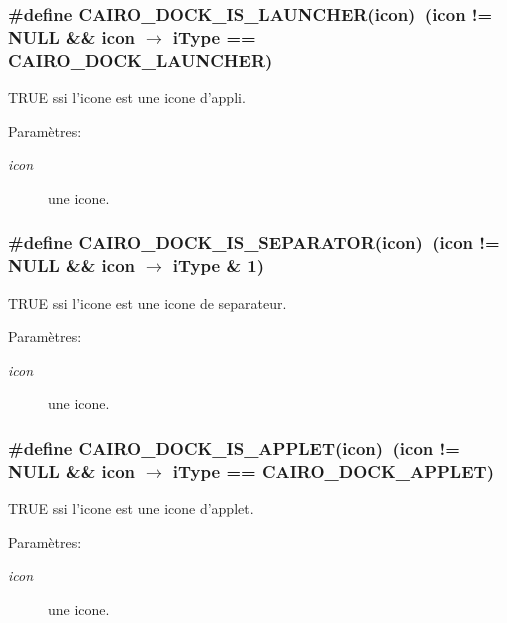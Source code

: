 \subsubsection{\setlength{\rightskip}{0pt plus 5cm}\#define CAIRO\_\-DOCK\_\-IS\_\-LAUNCHER(icon)~(icon != NULL \&\& icon $\rightarrow$ iType == CAIRO\_\-DOCK\_\-LAUNCHER)}\label{cairo-dock-icons_8h_168c94ad9d2454c1b5184144ce14619b}


TRUE ssi l'icone est une icone d'appli. \begin{Desc}
\item[Paramètres:]
\begin{description}
\item[{\em icon}]une icone. \end{description}
\end{Desc}
\subsubsection{\setlength{\rightskip}{0pt plus 5cm}\#define CAIRO\_\-DOCK\_\-IS\_\-SEPARATOR(icon)~(icon != NULL \&\& icon $\rightarrow$ iType \& 1)}\label{cairo-dock-icons_8h_9d30c0a85b089a0d98a428015d107f86}


TRUE ssi l'icone est une icone de separateur. \begin{Desc}
\item[Paramètres:]
\begin{description}
\item[{\em icon}]une icone. \end{description}
\end{Desc}
\subsubsection{\setlength{\rightskip}{0pt plus 5cm}\#define CAIRO\_\-DOCK\_\-IS\_\-APPLET(icon)~(icon != NULL \&\& icon $\rightarrow$ iType  == CAIRO\_\-DOCK\_\-APPLET)}\label{cairo-dock-icons_8h_71ae24f5e49a27e52e7175f0081e5f44}


TRUE ssi l'icone est une icone d'applet. \begin{Desc}
\item[Paramètres:]
\begin{description}
\item[{\em icon}]une icone. \end{description}
\end{Desc}

